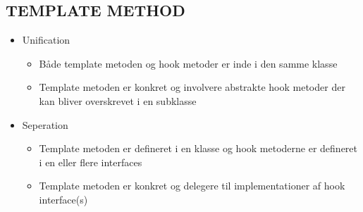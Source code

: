 \documentclass[a4, english]{article}
\begin{document}
\subsection{TEMPLATE METHOD}
\begin{itemize}
  \item Unification 
  \begin{itemize}
  	\item Både template metoden og hook metoder er inde i den samme klasse
    \item Template metoden er konkret og involvere abstrakte hook metoder der kan bliver overskrevet i en subklasse 
  \end{itemize}
	\item Seperation
  \begin{itemize}
  	\item Template metoden er defineret i en klasse og hook metoderne er defineret i en eller flere interfaces 
    \item Template metoden er konkret og delegere til implementationer af hook interface(s) 
  \end{itemize}
\end{itemize}
\end{document}
